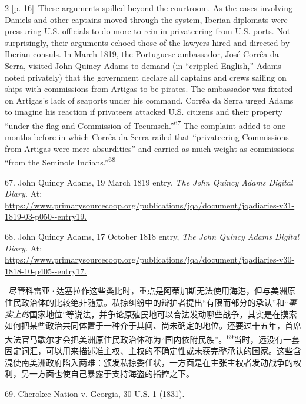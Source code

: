 \documentclass[10pt,a4paper]{article}
\begin{document}
\begin{paracol}{2}
\switchcolumn
{\scriptsize\color{gray} [p. 16]}\ These arguments spilled beyond the courtroom. As the cases involving Daniels and other captains moved through the system, Iberian diplomats were pressuring U.S. officials to do more to rein in privateering from U.S. ports. Not surprisingly, their arguments echoed those of the lawyers hired and directed by Iberian consuls. In March 1819, the Portuguese ambassador, José Corrêa da Serra, visited John Quincy Adams to demand (in “crippled English,” Adams noted privately) that the government declare all captains and crews sailing on ships with commissions from Artigas to be pirates. The ambassador was fixated on Artigas’s lack of seaports under his command. Corrêa da Serra urged Adams to imagine his reaction if privateers attacked U.S. citizens and their property “under the flag and Commission of Tecumseh.”\nobreak\textsuperscript{67} The complaint added to one months before in which Corrêa da Serra railed that “privateering Commissions from Artigas were mere absurdities” and carried as much weight as commissions “from the Seminole Indians.”\nobreak\textsuperscript{68}\par{\small 67. John Quincy Adams, 19 March 1819 entry, \textit{The John Quincy Adams Digital Diary.} At: \url{https://www.primarysourcecoop.org/publications/jqa/document/jqadiaries-v31-1819-03-p050--entry19.}\par}{\small 68. John Quincy Adams, 17 October 1818 entry, \textit{The John Quincy Adams Digital Diary.} At: \url{https://www.primarysourcecoop.org/publications/jqa/document/jqadiaries-v30-1818-10-p405--entry17.}\par}
\switchcolumn*
{\scriptsize\color{gray} [p. 17]}\ 尽管科雷亚·达塞拉作这些类比时，重点是阿蒂加斯无法使用海港，但与美洲原住民政治体的比较绝非随意。私掠纠纷中的辩护者提出“有限而部分的承认”和“\textit{事实上的}国家地位”等说法，并争论原殖民地可以合法发动哪些战争，其实是在摸索如何把某些政治共同体置于一种介于其间、尚未确定的地位。还要过十五年，首席大法官马歇尔才会把美洲原住民政治体称为“国内依附民族”。\nobreak\textsuperscript{69}当时，远没有一套固定词汇，可以用来描述准主权、主权的不确定性或未获完整承认的国家。这些含混使南美洲政府陷入两难：颁发私掠委任状，一方面是在主张主权者发动战争的权利，另一方面也使自己暴露于支持海盗的指控之下。\par{\small 69. Cherokee Nation v. Georgia, 30 U.S. 1 (1831).\par}
\switchcolumn

\end{paracol}
\end{document}
